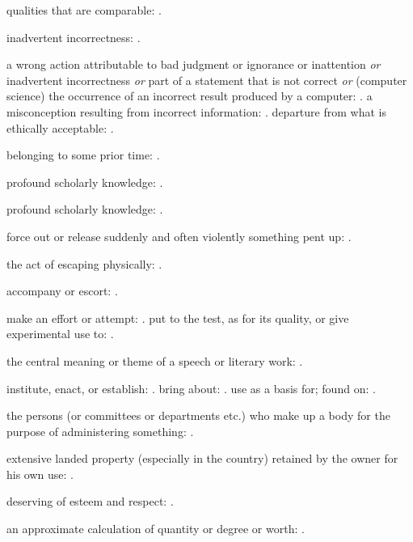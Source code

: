   qualities that are comparable: .

  inadvertent incorrectness: .

  a wrong action attributable to bad judgment or ignorance or inattention \textit{or} inadvertent incorrectness \textit{or} part of a statement that is not correct \textit{or} (computer science) the occurrence of an incorrect result produced by a computer: . a misconception resulting from incorrect information: . departure from what is ethically acceptable: .

  belonging to some prior time: .

  profound scholarly knowledge: .

  profound scholarly knowledge: .

  force out or release suddenly and often violently something pent up: .

  the act of escaping physically: .

  accompany or escort: .

  make an effort or attempt: . put to the test, as for its quality, or give experimental use to: .

  the central meaning or theme of a speech or literary work: .

  institute, enact, or establish: . bring about: . use as a basis for; found on: .

  the persons (or committees or departments etc.) who make up a body for the purpose of administering something: .

  extensive landed property (especially in the country) retained by the owner for his own use: .

  deserving of esteem and respect: .

  an approximate calculation of quantity or degree or worth: .

